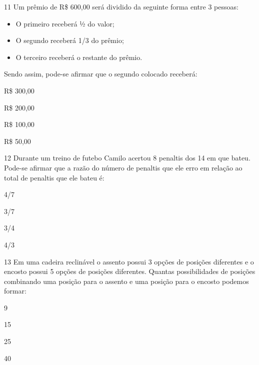 \num{11} Um prêmio de R\$ 600,00 será dividido da seguinte forma entre 3
pessoas:

\begin{itemize}
\item
  O primeiro receberá ½ do valor;
\item
  O segundo receberá 1/3 do prêmio;
\item
  O terceiro receberá o restante do prêmio.
\end{itemize}

Sendo assim, pode-se afirmar que o segundo colocado receberá:

\begin{escolha}
\item
  R\$ 300,00
\item
  R\$ 200,00
\item
  R\$ 100,00
\item
  R\$ 50,00
\end{escolha}


\num{12} Durante um treino de futebo Camilo acertou 8 penaltis dos 14 em
que bateu. Pode-se afirmar que a razão do número de penaltis que ele
erro em relação ao total de penaltis que ele bateu é:

\begin{escolha}
\item
  4/7
\item
  3/7
\item
  3/4
\item
  4/3
\end{escolha}


\num{13} Em uma cadeira reclinável o assento possui 3 opções de posições
diferentes e o encosto possui 5 opções de posições diferentes. Quantas
possibilidades de posições combinando uma posição para o assento e uma
posição para o encosto podemos formar:

\begin{escolha}
\item
  9
\item
  15
\item
  25
\item
  40
\end{escolha}

